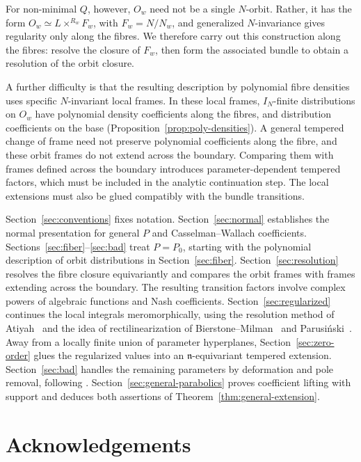 \documentclass[a4paper,12pt]{amsart}
\numberwithin{equation}{section}
\theoremstyle{definition}
\theoremstyle{remark}
\newcommand{\fn}{\mathfrak n}
\newcommand{\IN}{I_N}
\begin{document}
For non-minimal $Q$, however, $O_w$ need not be a single $N$-orbit. Rather, it has the form $O_w\simeq L\times^{R_w}F_w$, with $F_w=N/N_w$, and generalized $N$-invariance gives regularity only along the fibres. We therefore carry out this construction along the fibres: resolve the closure of $F_w$, then form the associated bundle to obtain a resolution of the orbit closure.

A further difficulty is that the resulting description by polynomial fibre densities uses specific $N$-invariant local frames. In these local frames, $\IN$-finite distributions on $O_w$ have polynomial density coefficients along the fibres, and distribution coefficients on the base (Proposition~\ref{prop:poly-densities}). A general tempered change of frame need not preserve polynomial coefficients along the fibre, and these orbit frames do not extend across the boundary. Comparing them with frames defined across the boundary introduces parameter-dependent tempered factors, which must be included in the analytic continuation step. The local extensions must also be glued compatibly with the bundle transitions.

Section~\ref{sec:conventions} fixes notation. Section~\ref{sec:normal} establishes the normal presentation for general $P$ and Casselman--Wallach coefficients. Sections~\ref{sec:fiber}--\ref{sec:bad} treat $P=P_0$, starting with the polynomial description of orbit distributions in Section~\ref{sec:fiber}. Section~\ref{sec:resolution} resolves the fibre closure equivariantly and compares the orbit frames with frames extending across the boundary. The resulting transition factors involve complex powers of algebraic functions and Nash coefficients. Section~\ref{sec:regularized} continues the local integrals meromorphically, using the resolution method of Atiyah~\cite{Ati70} and the idea of  rectilinearization of Bierstone--Milman~\cite{BM88} and Parusi\'nski~\cite{Par94}. Away from a locally finite union of parameter hyperplanes, Section~\ref{sec:zero-order} glues the regularized values into an $\fn$-equivariant tempered extension. Section~\ref{sec:bad} handles the remaining parameters by deformation and pole removal, following \cite[Lemmas~4.5--4.6]{Abe12}.
Section~\ref{sec:general-parabolics} proves coefficient lifting with support and deduces both assertions of Theorem~\ref{thm:general-extension}.


\section*{Acknowledgements}
\end{document}
